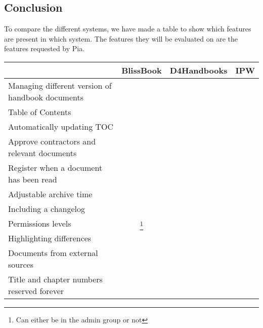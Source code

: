 \subsection{Conclusion}
To compare the different systems, we have made a table to show which features are present in which system. The features they will be evaluated on are the features requested by Pia.
\begin{center}
  \begin{tabular}{| l | c | c | c |}
    \hline
		 & BlissBook & D4Handbooks & IPW \\ \hline
		Managing different version of handbook documents & \checkmark &  &  \\ \hline
		Table of Contents & \checkmark &  &  \\ \hline
		Automatically updating TOC & \checkmark &  &  \\ \hline
		Approve contractors and relevant documents &  &  &  \\ \hline
		Register when a document has been read & \checkmark &  &  \\ \hline
		Adjustable archive time &  &  &  \\ \hline
		Including a changelog & \checkmark &  &  \\ \hline
		Permissions levels & \checkmark\footnote{Can either be in the admin group or not} &  &  \\ \hline
		Highlighting differences & \checkmark &  &  \\ \hline
		Documents from external sources &  &  &  \\ \hline
		Title and chapter numbers reserved forever &  &  &  \\
    \hline
  \end{tabular}
\end{center}

